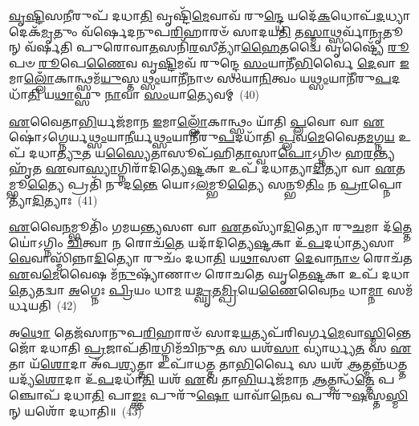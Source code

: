 {\anuvakamend[{\-\ul{𑌸𑍁}\-\-\ul{𑌵}\-𑌰𑍍𑌗\-\ul{𑌮𑍇}\-𑌵 𑌤𑌾 \ul{𑌏}\-𑌵 \ul{𑌚}\-𑌤𑍍𑌵𑌾𑌰𑌿᳴ 𑌚}]}%

\-\ul{𑌵𑍃}\-\-\ul{𑌷𑍍𑌟𑌿}\-𑌸\-\ul{𑌨𑍀}\-𑌰𑍁𑌪᳴ 𑌦𑌧𑌾\-\ul{𑌤𑌿} 𑌵𑍃𑌷𑍍𑌟𑌿᳴\-\ul{𑌮𑍇}\-𑌵𑌾𑌵᳴ 𑌰𑍁\-\ul{𑌨𑍍𑌦𑍍𑌧𑍇} 𑌯𑌦𑍇᳴\-\ul{𑌕}\-𑌧𑍋𑌪᳴\-\ul{𑌦}\-𑌧𑍍𑌯𑌾𑌦𑍇𑌕᳴\-\ul{𑌮𑍃}\-𑌤𑍁𑌂 𑌵᳴𑌰𑍍\mbox{}𑌷𑍇𑌦𑌨𑍁𑌪\-\ul{𑌰𑌿}\-𑌹𑌾𑌰𑍞᳴ 𑌸𑌾𑌦𑌯\-\ul{𑌤𑌿} 𑌤\-\ul{𑌸𑍍𑌮𑌾}\-𑌥𑍍𑌸𑌰𑍍𑌵𑌾᳴\-\ul{𑌨𑍃}\-𑌤𑍂𑌨𑍍 𑌵᳴𑌰𑍍\mbox{}𑌷𑌤𑌿 𑌪𑍁𑌰𑍋𑌵𑌾\-\ul{𑌤}\-𑌸𑌨𑌿᳴\-\ul{𑌰}\-𑌸𑍀𑌤𑍍𑌯𑌾᳴\-\ul{𑌹𑍈}\-𑌤𑌦𑍍𑌵𑍈 𑌵𑍃𑌷𑍍𑌟𑍍𑌯𑍈᳴ \ul{𑌰𑍂}\-𑌪𑍞 \ul{𑌰𑍂}\-𑌪𑍇\-\ul{𑌣𑍈}\-𑌵 𑌵𑍃\-\ul{𑌷𑍍𑌟𑌿}\-𑌮𑌵᳴ 𑌰𑍁𑌨𑍍𑌦𑍍𑌧𑍇 \ul{𑌸𑌂}\-𑌯𑌾𑌨𑍀᳴\-\ul{𑌭𑌿}\-𑌰𑍍𑌵𑍈 \ul{𑌦𑍇}\-𑌵𑌾 \ul{𑌇}\-𑌮𑌾\-\ul{𑌲𑍍𑌲𑍋𑌁}\-𑌕𑌾𑌨𑍍𑌥𑍍𑌸𑌮᳴\-\ul{𑌯𑍁}\-𑌸𑍍𑌤\-\ul{𑌥𑍍𑌸𑌂}\-𑌯𑌾𑌨𑍀᳴𑌨𑌾𑍞 𑌸𑌂𑌯𑌾\-\ul{𑌨𑌿}\-𑌤𑍍𑌵𑌂 𑌯\-\ul{𑌥𑍍𑌸𑌂}\-𑌯𑌾𑌨𑍀᳴𑌰𑍁\-\ul{𑌪}\-𑌦𑌧𑌾᳴\-\ul{𑌤𑌿} 𑌯\-\ul{𑌥𑌾}\-𑌫𑍍𑌸𑍁 \ul{𑌨𑌾}\-𑌵𑌾 \ul{𑌸𑌂}\-𑌯𑌾\-\ul{𑌤𑍍𑌯𑍇}\-𑌵𑌮𑍍~(40)

\-\ul{𑌏}\-𑌵𑍈𑌤𑌾\-\ul{𑌭𑌿}\-𑌰𑍍𑌯𑌜᳴𑌮𑌾𑌨 \ul{𑌇}\-𑌮𑌾\-\ul{𑌲𑍍𑌲𑍋𑌁}\-𑌕𑌾𑌨𑍍𑌥𑍍𑌸𑌂 𑌯𑌾᳴𑌤𑌿 \ul{𑌪𑍍𑌲}\-𑌵𑍋 𑌵𑌾 \ul{𑌏}\-𑌷𑍋॑\-𑌽𑌗𑍍𑌨𑍇𑌰𑍍𑌯\-\ul{𑌥𑍍𑌸𑌂}\-𑌯𑌾\-\ul{𑌨𑍀}\-𑌰𑍍𑌯\-\ul{𑌥𑍍𑌸𑌂}\-𑌯𑌾𑌨𑍀᳴𑌰𑍁\-\ul{𑌪}\-𑌦𑌧𑌾᳴𑌤𑌿 \ul{𑌪𑍍𑌲}\-𑌵\-\ul{𑌮𑍇}\-𑌵𑍈𑌤\-\ul{𑌮}\-𑌗𑍍𑌨\-\ul{𑌯} 𑌉𑌪᳴ 𑌦𑌧𑌾\-\ul{𑌤𑍍𑌯𑍁}\-𑌤 𑌯\-\ul{𑌸𑍍𑌯𑍈}\-𑌤𑌾𑌸𑍂𑌪᳴𑌹𑌿\-\ul{𑌤𑌾}\-𑌸𑍍𑌵𑌾\-\ul{𑌪𑍋}\-\-𑌽𑌗𑍍𑌨𑌿𑍞 𑌹\-\ul{𑌰}\-𑌨𑍍𑌤𑍍𑌯𑌹𑍃᳴𑌤 \ul{𑌏}\-𑌵𑌾\-\ul{𑌸𑍍𑌯𑌾}\-𑌗𑍍𑌨𑌿𑌰𑌾᳴𑌦𑌿𑌤𑍍𑌯𑍇\-\ul{𑌷𑍍𑌟}\-𑌕𑌾 𑌉𑌪᳴ 𑌦𑌧𑌾𑌤𑍍𑌯𑌾\-\ul{𑌦𑌿}\-𑌤𑍍𑌯𑌾 𑌵𑌾 \ul{𑌏}\-𑌤𑌮𑍍𑌭𑍂\-\ul{𑌤𑍍𑌯𑍈} 𑌪𑍍𑌰𑌤𑌿᳴ 𑌨𑍁𑌦\-\ul{𑌨𑍍𑌤𑍇} 𑌯𑍋\-𑌽\-\ul{𑌲}\-𑌮𑍍𑌭𑍂\-\ul{𑌤𑍍𑌯𑍈} 𑌸𑌨𑍍𑌭𑍂\-\ul{𑌤𑌿𑌂} 𑌨 \ul{𑌪𑍍𑌰𑌾}\-𑌪𑍍𑌨𑍋𑌤𑍍𑌯𑌾᳴\-\ul{𑌦𑌿}\-𑌤𑍍𑌯𑌾𑌃~(41)

\-\ul{𑌏}\-𑌵𑍈\-\ul{𑌨}\-𑌮𑍍𑌭𑍂𑌤𑌿𑌂᳴ 𑌗𑌮𑌯\-\ul{𑌨𑍍𑌤𑍍𑌯}\-𑌸𑍗 𑌵𑌾 \ul{𑌏}\-𑌤𑌸𑍍𑌯𑌾᳴\-\ul{𑌦𑌿}\-𑌤𑍍𑌯𑍋 𑌰𑍁\-\ul{𑌚}\-𑌮𑌾 𑌦᳴\-\ul{𑌤𑍍𑌤𑍇} 𑌯𑍋॑\-𑌽𑌗𑍍𑌨𑌿𑌂 \ul{𑌚𑌿}\-𑌤𑍍𑌵𑌾 𑌨 𑌰𑍋𑌚᳴\-\ul{𑌤𑍇} 𑌯𑌦𑌾᳴𑌦𑌿𑌤𑍍𑌯𑍇\-\ul{𑌷𑍍𑌟}\-𑌕𑌾 𑌉᳴\-\ul{𑌪}\-𑌦𑌧𑌾॑\-\ul{𑌤𑍍𑌯}\-𑌸𑌾\-\ul{𑌵𑍇}\-𑌵𑌾𑌸𑍍𑌮𑌿᳴𑌨𑍍𑌨𑌾\-\ul{𑌦𑌿}\-𑌤𑍍𑌯𑍋 𑌰𑍁𑌚𑌂᳴ 𑌦𑌧𑌾\-\ul{𑌤𑌿} 𑌯\-\ul{𑌥𑌾}\-𑌸𑍗 \ul{𑌦𑍇}\-𑌵𑌾\-\ul{𑌨𑌾}\-\-\ul{𑍞} 𑌰𑍋𑌚᳴𑌤 \ul{𑌏}\-𑌵\-\ul{𑌮𑍇}\-𑌵𑍈𑌷 𑌮᳴\-\ul{𑌨𑍁}\-𑌷𑍍𑌯𑌾᳴𑌣𑌾𑍞 𑌰𑍋𑌚𑌤𑍇 𑌘𑍃𑌤𑍇\-\ul{𑌷𑍍𑌟}\-𑌕𑌾 𑌉𑌪᳴ 𑌦𑌧𑌾\-\ul{𑌤𑍍𑌯𑍇}\-𑌤𑌦𑍍𑌵𑌾 \ul{𑌅}\-𑌗𑍍𑌨𑍇𑌃 \ul{𑌪𑍍𑌰𑌿}\-𑌯𑌂 𑌧𑌾\-\ul{𑌮} 𑌯\-\ul{𑌦𑍍𑌘𑍃}\-𑌤\-\ul{𑌮𑍍𑌪𑍍𑌰𑌿}\-𑌯𑍇\-\ul{𑌣𑍈}\-𑌵𑍈\-\ul{𑌨𑌂} 𑌧𑌾\-\ul{𑌮𑍍𑌨𑌾} 𑌸𑌮᳴𑌰𑍍𑌧𑌯𑌤𑌿~(42)

𑌅\-\ul{𑌥𑍋} 𑌤𑍇𑌜᳴𑌸𑌾𑌨𑍁𑌪\-\ul{𑌰𑌿}\-𑌹𑌾𑌰𑍞᳴ 𑌸𑌾𑌦\-\ul{𑌯}\-𑌤𑍍𑌯𑌪᳴𑌰𑌿𑌵𑌰𑍍𑌗\-\ul{𑌮𑍇}\-𑌵𑌾\-\ul{𑌸𑍍𑌮𑌿}\-𑌨𑍍𑌤𑍇𑌜𑍋᳴ 𑌦𑌧𑌾𑌤𑌿 \ul{𑌪𑍍𑌰}\-𑌜𑌾𑌪᳴𑌤𑌿\-\ul{𑌰}\-𑌗𑍍𑌨𑌿𑌮᳴𑌚𑌿𑌨𑍁\-\ul{𑌤} 𑌸 𑌯𑌶᳴\-\ul{𑌸𑌾} 𑌵𑍍𑌯𑌾॑𑌰𑍍𑌧𑍍𑌯\-\ul{𑌤} 𑌸 \ul{𑌏}\-𑌤𑌾 𑌯᳴\-\ul{𑌶𑍋}\-𑌦𑌾 𑌅᳴𑌪\-\ul{𑌶𑍍𑌯}\-𑌤𑍍𑌤𑌾 𑌉𑌪𑌾᳴𑌧\-\ul{𑌤𑍍𑌤} 𑌤𑌾\-\ul{𑌭𑌿}\-𑌰𑍍𑌵𑍈 𑌸 𑌯𑌶᳴ \ul{𑌆}\-𑌤𑍍𑌮𑌨𑍍𑌨᳴𑌧\-\ul{𑌤𑍍𑌤} 𑌯𑌦𑍍𑌯᳴\-\ul{𑌶𑍋}\-𑌦𑌾 𑌉᳴\-\ul{𑌪}\-𑌦𑌧𑌾᳴\-\ul{𑌤𑌿} 𑌯𑌶᳴ \ul{𑌏}\-𑌵 𑌤𑌾\-\ul{𑌭𑌿}\-𑌰𑍍𑌯𑌜᳴𑌮𑌾𑌨 \ul{𑌆}\-𑌤𑍍𑌮𑌨𑍍𑌧᳴\-\ul{𑌤𑍍𑌤𑍇} 𑌪𑌞𑍍𑌚𑍋𑌪᳴ 𑌦𑌧𑌾\-\ul{𑌤𑌿} 𑌪𑌾\-\ul{𑌙𑍍𑌕𑍍𑌤𑌃} 𑌪𑍁𑌰𑍁᳴\-\ul{𑌷𑍋} 𑌯𑌾𑌵𑌾᳴\-\ul{𑌨𑍇}\-𑌵 𑌪𑍁𑌰𑍁᳴\-\ul{𑌷}\-𑌸𑍍𑌤\-\ul{𑌸𑍍𑌮𑌿}\-𑌨𑍍 𑌯𑌶𑍋᳴ 𑌦𑌧𑌾𑌤𑌿॥~(43)

{\anuvakamend[{\-\ul{𑌏}\-𑌵𑌂 \ul{𑌪𑍍𑌰𑌾}\-𑌪𑍍𑌨𑍋𑌤𑍍𑌯𑌾᳴\-\ul{𑌦𑌿}\-𑌤𑍍𑌯𑌾 𑌅᳴𑌰𑍍𑌧\-\ul{𑌯}\-𑌤𑍍𑌯𑍇\-\ul{𑌕𑌾}\-𑌨𑍍𑌨𑌪᳴\-\ul{𑌞𑍍𑌚𑌾}\-𑌶𑌚𑍍𑌚᳴}]}%

